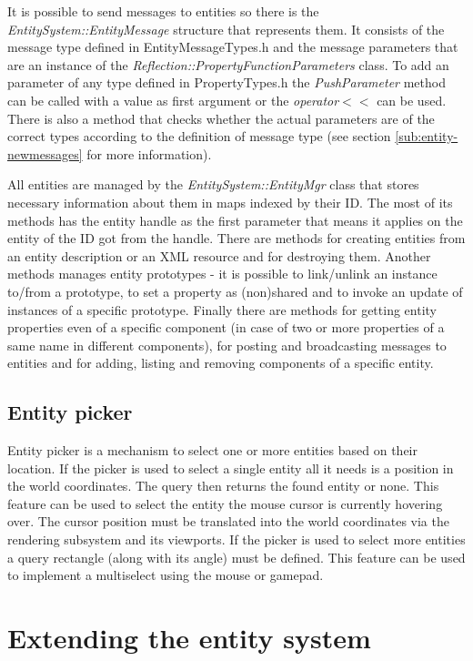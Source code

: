 It is possible to send messages to entities so there is the \emph{EntitySystem::EntityMessage} structure that represents them. It consists of the message type defined in EntityMessageTypes.h and the message parameters that are an instance of the \emph{Reflection::PropertyFunctionParameters} class. To add an parameter of any type defined in PropertyTypes.h the \emph{PushParameter} method can be called with a value as first argument or the \emph{operator}$<<$ can be used. There is also a method that checks whether the actual parameters are of the correct types according to the definition of message type (see section \ref{sub:entity-newmessages} for more information).

All entities are managed by the \emph{EntitySystem::EntityMgr} class that stores necessary information about them in maps indexed by their ID. The most of its methods has the entity handle as the first parameter that means it applies on the entity of the ID got from the handle. There are methods for creating entities from an entity description or an XML resource and for destroying them. Another methods manages entity prototypes - it is possible to link/unlink an instance to/from a prototype, to set a property as (non)shared and to invoke an update of instances of a specific prototype. Finally there are methods for getting entity properties even of a specific component (in case of two or more properties of a same name in different components), for posting and broadcasting messages to entities and for adding, listing and removing components of a specific entity.

\subsection{Entity picker}

Entity picker is a mechanism to select one or more entities based on their location. If the picker is used to select a single entity all it needs is a position in the world coordinates. The query then returns the found entity or none. This feature can be used to select the entity the mouse cursor is currently hovering over. The cursor position must be translated into the world coordinates via the rendering subsystem and its viewports. If the picker is used to select more entities a query rectangle (along with its angle) must be defined. This feature can be used to implement a multiselect using the mouse or gamepad.



\section{Extending the entity system}

